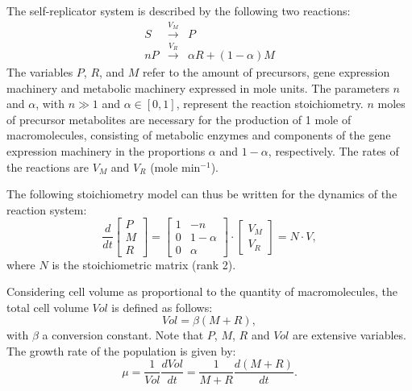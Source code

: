 \documentclass[a4paper, 10pt, conference]{ieeeconf}      %
\begin{document}
The self-replicator system is described by the following two reactions:
\begin{eqnarray*}
S  &\overset{V_M}{\longrightarrow}& P \\
nP &\overset{V_R}{\longrightarrow}& \alpha R + (1-\alpha) M
\end{eqnarray*}
The variables $P$, $R$, and $M$ refer to the amount of precursors, gene expression machinery and metabolic machinery expressed in mole units.
The parameters $n$ and $\alpha$, with $n \gg 1$ and $\alpha \in [0,1]$, represent the reaction stoichiometry.
$n$ moles of precursor metabolites are necessary for the production of 1 mole of macromolecules, consisting of metabolic enzymes and components of the gene expression machinery in the proportions $\alpha$ and $1 - \alpha$, respectively.
The rates of the reactions are $V_M$ and $V_R$ (mole min$^{-1}$).

The following stoichiometry model can thus be written for the dynamics of the reaction system:
\begin{equation}
\frac{d}{dt} \left[
\begin{matrix}
P\\
M\\
R
\end{matrix}
\right] = \left[
\begin{matrix}
1 &-n\\
0 & 1 - \alpha\\
0 & \alpha
\end{matrix}
\right] \cdot \left[
\begin{matrix}
V_M \\ V_R
\end{matrix}
\right] = N\cdot V,
\end{equation}
where $N$ is the stoichiometric matrix (rank 2).

Considering cell volume as proportional to the quantity of macromolecules, the total cell volume $\mathit{Vol}$ is defined as follows:
\[
\mathit{Vol}=\beta (M+R),
\]
with $\beta$ a conversion constant. Note that $P$, $M$, $R$ and $\mathit{Vol}$ are extensive variables.
The growth rate of the population is given by:
\[
\mu = \frac{1}{\mathit{Vol}} \frac{d\mathit{Vol}}{dt} = \frac{1}{M+R}\frac{d(M+R)}{dt}.
\]
\end{document}
